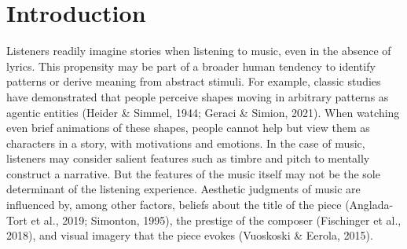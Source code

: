 \documentclass[12pt,twoside]{reedthesis}
\begin{document}
	

  \mainmatter %
  \pagestyle{fancyplain} %


    \chapter*{Introduction}

\doublespacing

Listeners readily imagine stories when listening to music, even in the absence of lyrics. This propensity may be part of a broader human tendency to identify patterns or derive meaning from abstract stimuli. For example, classic studies have demonstrated that people perceive shapes moving in arbitrary patterns as agentic entities (Heider \& Simmel, 1944; Geraci \& Simion, 2021). When watching even brief animations of these shapes, people cannot help but view them as characters in a story, with motivations and emotions. In the case of music, listeners may consider salient features such as timbre and pitch to mentally construct a narrative. But the features of the music itself may not be the sole determinant of the listening experience. Aesthetic judgments of music are influenced by, among other factors, beliefs about the title of the piece (Anglada-Tort et al., 2019; Simonton, 1995), the prestige of the composer (Fischinger et al., 2018), and visual imagery that the piece evokes (Vuoskoski \& Eerola, 2015). 
\end{document}
